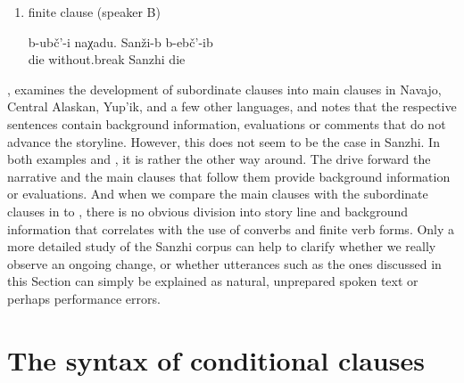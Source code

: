 \begin{enumerate}
	\item	finite clause (speaker B)
	\begin{exe}
		\ex	\label{ex:‎They died without stopping, in Sanzhi (people) died}
		\gll	b-ubč'-i	naχadu.	Sanži-b	b-ebč'-ib\\
			die	without.break	Sanzhi	die\\
		\glt	{}
	\end{exe}
\end{enumerate}

\citet{Mithun2008}, examines the development of subordinate clauses into main clauses in Navajo, Central Alaskan, Yup'ik, and a few other languages, and notes that the respective sentences contain background information, evaluations or comments that do not advance the storyline. However, this does not seem to be the case in Sanzhi. In both examples  and , it is rather the other way around. The  drive forward the narrative and the main clauses that follow them provide background information or evaluations. And when we compare the main clauses with the subordinate clauses in  to , there is no obvious division into story line and background information that correlates with the use of converbs and finite verb forms. Only a more detailed study of the Sanzhi corpus can help to clarify whether we really observe an ongoing change, or whether utterances such as the ones discussed in this Section can simply be explained as natural, unprepared spoken text or perhaps performance errors.



\section{The syntax of conditional clauses}
\label{sec:The syntax of \isi{conditional} clauses}


